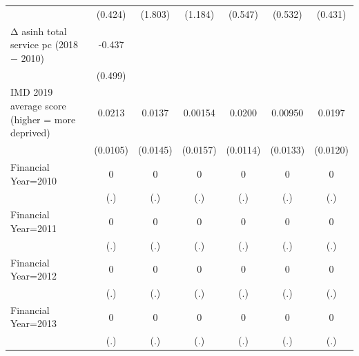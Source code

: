 \begin{table}[htbp]
\begin{tabular}{l*{6}{c}}
                    &     (0.424)         &     (1.803)         &     (1.184)         &     (0.547)         &     (0.532)         &     (0.431)         \\
\addlinespace
Δ asinh total service pc (2018 − 2010)&      -0.437         &                     &                     &                     &                     &                     \\
                    &     (0.499)         &                     &                     &                     &                     &                     \\
\addlinespace
IMD 2019 average score (higher = more deprived)&      0.0213\sym{**} &      0.0137         &     0.00154         &      0.0200\sym{*}  &     0.00950         &      0.0197         \\
                    &    (0.0105)         &    (0.0145)         &    (0.0157)         &    (0.0114)         &    (0.0133)         &    (0.0120)         \\
\addlinespace
Financial Year=2010 &           0         &           0         &           0         &           0         &           0         &           0         \\
                    &         (.)         &         (.)         &         (.)         &         (.)         &         (.)         &         (.)         \\
\addlinespace
Financial Year=2011 &           0         &           0         &           0         &           0         &           0         &           0         \\
                    &         (.)         &         (.)         &         (.)         &         (.)         &         (.)         &         (.)         \\
\addlinespace
Financial Year=2012 &           0         &           0         &           0         &           0         &           0         &           0         \\
                    &         (.)         &         (.)         &         (.)         &         (.)         &         (.)         &         (.)         \\
\addlinespace
Financial Year=2013 &           0         &           0         &           0         &           0         &           0         &           0         \\
                    &         (.)         &         (.)         &         (.)         &         (.)         &         (.)         &         (.)         \\

\end{tabular}
\end{table}
